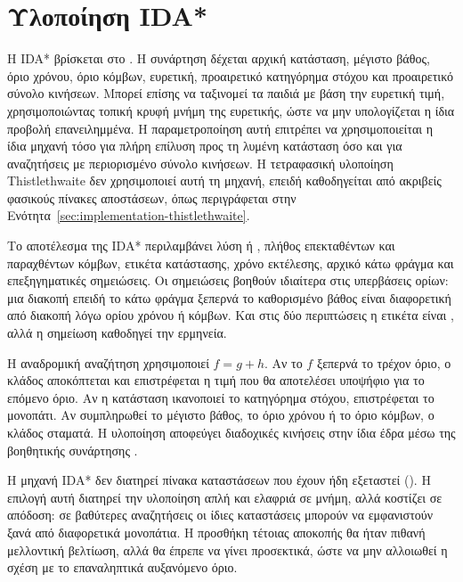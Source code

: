 \section{Υλοποίηση IDA*}
\label{sec:implementation-ida}
Η IDA* βρίσκεται στο . Η συνάρτηση δέχεται αρχική κατάσταση, μέγιστο βάθος, όριο χρόνου, όριο κόμβων, ευρετική, προαιρετικό κατηγόρημα στόχου και προαιρετικό σύνολο κινήσεων. Μπορεί επίσης να ταξινομεί τα παιδιά με βάση την ευρετική τιμή, χρησιμοποιώντας τοπική κρυφή μνήμη της ευρετικής, ώστε να μην υπολογίζεται η ίδια προβολή επανειλημμένα. Η παραμετροποίηση αυτή επιτρέπει να χρησιμοποιείται η ίδια μηχανή τόσο για πλήρη επίλυση προς τη λυμένη κατάσταση όσο και για αναζητήσεις με περιορισμένο σύνολο κινήσεων. Η τετραφασική υλοποίηση Thistlethwaite δεν χρησιμοποιεί αυτή τη μηχανή, επειδή καθοδηγείται από ακριβείς φασικούς πίνακες αποστάσεων, όπως περιγράφεται στην Ενότητα~\ref{sec:implementation-thistlethwaite}.

Το αποτέλεσμα της IDA* περιλαμβάνει λύση ή , πλήθος επεκταθέντων και παραχθέντων κόμβων, ετικέτα κατάστασης, χρόνο εκτέλεσης, αρχικό κάτω φράγμα και επεξηγηματικές σημειώσεις. Οι σημειώσεις βοηθούν ιδιαίτερα στις υπερβάσεις ορίων: μια διακοπή επειδή το κάτω φράγμα ξεπερνά το καθορισμένο βάθος είναι διαφορετική από διακοπή λόγω ορίου χρόνου ή κόμβων. Και στις δύο περιπτώσεις η ετικέτα είναι , αλλά η σημείωση καθοδηγεί την ερμηνεία.

Η αναδρομική αναζήτηση χρησιμοποιεί \(f=g+h\). Αν το \(f\) ξεπερνά το τρέχον όριο, ο κλάδος αποκόπτεται και επιστρέφεται η τιμή που θα αποτελέσει υποψήφιο για το επόμενο όριο. Αν η κατάσταση ικανοποιεί το κατηγόρημα στόχου, επιστρέφεται το μονοπάτι. Αν συμπληρωθεί το μέγιστο βάθος, το όριο χρόνου ή το όριο κόμβων, ο κλάδος σταματά. Η υλοποίηση αποφεύγει διαδοχικές κινήσεις στην ίδια έδρα μέσω της βοηθητικής συνάρτησης .

Η μηχανή IDA* δεν διατηρεί πίνακα καταστάσεων που έχουν ήδη εξεταστεί (). Η επιλογή αυτή διατηρεί την υλοποίηση απλή και ελαφριά σε μνήμη, αλλά κοστίζει σε απόδοση: σε βαθύτερες αναζητήσεις οι ίδιες καταστάσεις μπορούν να εμφανιστούν ξανά από διαφορετικά μονοπάτια. Η προσθήκη τέτοιας αποκοπής θα ήταν πιθανή μελλοντική βελτίωση, αλλά θα έπρεπε να γίνει προσεκτικά, ώστε να μην αλλοιωθεί η σχέση με το επαναληπτικά αυξανόμενο όριο.

